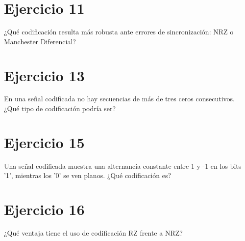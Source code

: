 \documentclass[a4paper,12pt]{article}
\begin{document}
\section*{Ejercicio 11}
¿Qué codificación resulta más robusta ante errores de sincronización: NRZ o Manchester Diferencial?

\section*{Ejercicio 13}
En una señal codificada no hay secuencias de más de tres ceros consecutivos. ¿Qué tipo de codificación podría ser?


\section*{Ejercicio 15}
Una señal codificada muestra una alternancia constante entre 1 y -1 en los bits '1', mientras los '0' se ven planos. ¿Qué codificación es?

\section*{Ejercicio 16}
¿Qué ventaja tiene el uso de codificación RZ frente a NRZ?
\end{document}
